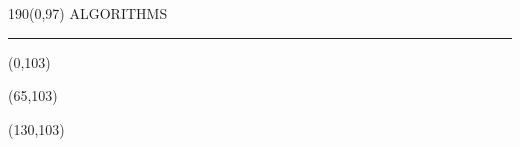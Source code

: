 \begin{textblock}{190}(0,97)
\sffamily\normalsize{\color{sciorange}ALGORITHMS}\small\\
\rule[3mm]{190mm}{0.1pt}
\end{textblock} 

\begin{textblock}{60}(0,103)
        
\end{textblock}

\begin{textblock}{60}(65,103)
    
\end{textblock}

\begin{textblock}{60}(130,103)
    
\end{textblock}